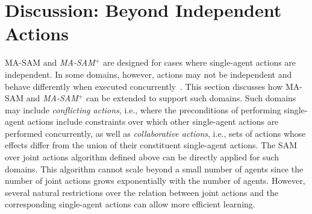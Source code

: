 \documentclass[letterpaper]{article} %
\theoremstyle{definition}
\theoremstyle{remark}
\newcommand{\iseff}{\text{IsEff}}
\newcommand{\sam}{\ac{SAM}\xspace}
\newcommand{\masam}{\ac{MA-SAM}\xspace}
\newcommand{\cmasam}{\textit{MA-SAM\ensuremath{^+}}\xspace}
\begin{document}












\section{Discussion: Beyond Independent Actions}

\masam and \cmasam are designed for cases where single-agent actions are independent. 
In some domains, however, actions may not be independent and behave differently when executed concurrently~. This section discusses how \masam and \cmasam can be extended to support such domains. Such domains may include \emph{conflicting actions}, i.e., where the preconditions of performing single-agent actions include constraints over which other single-agent actions are performed concurrently, as well as \emph{collaborative actions}, i.e., sets of actions whose effects differ from the union of their constituent single-agent actions.
The \sam over joint actions algorithm defined above can be directly applied for such domains. 
This algorithm cannot scale beyond a small number of agents since the number of joint actions grows exponentially with the number of agents. 
However, several natural restrictions over the relation between joint actions and the corresponding single-agent actions can allow more efficient learning. 
\end{document}
